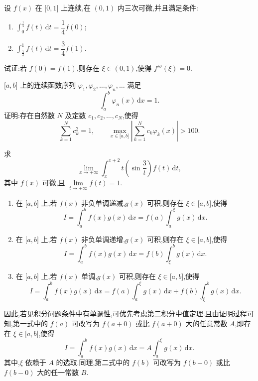 \documentclass[../数学分析培优讲义.tex]{subfiles}
\begin{document}
\begin{example}
设 $f(x)$ 在 $\lbrack 0,1\rbrack$ 上连续,在 $(0,1)$ 内三次可微,并且满足条件:
\begin{enumerate}[label=(\arabic*)]
    \item $\displaystyle\int_0^{\frac{1}{4}}f(t)\,\mathrm{d}t=\dfrac{1}{4}f(0)$;
    \item $\displaystyle\int_{\frac{1}{4}}^1f(t)\,\mathrm{d}t=\dfrac{3}{4}f(1)$.
\end{enumerate}
试证:若 $f(0)=f(1)$,则存在 $\xi\in(0,1)$,使得 $f'''(\xi)=0$.
\end{example}
\exampleblank

\begin{example}
$\lbrack a,b\rbrack$ 上的连续函数序列 $\varphi_1,\varphi_2,\ldots,\varphi_n,\ldots$ 满足
\[
    \int_a^b\varphi_n(x)\,\mathrm{d}x=1.
\]
证明:存在自然数 $N$ 及定数 $c_1,c_2,\ldots,c_N$,使得
\[
    \sum\limits_{k=1}^N c_k^2=1,
    \qquad
    \max\limits_{x\in\lbrack a,b\rbrack}\left|\sum\limits_{k=1}^Nc_k\varphi_k(x)\right|>100.
\]
\end{example}
\exampleblank

\begin{example}
求
\[
    \lim\limits_{x\to+\infty}
    \int_x^{x+2}t\left(\sin\dfrac{3}{t}\right)f(t)\,\mathrm{d}t,
\]
其中 $f(x)$ 可微,且 $\displaystyle\lim\limits_{t\to+\infty}f(t)=1$.
\end{example}
\exampleblank

\begin{theorem}
\begin{enumerate}[label=(\arabic*)]
    \item 在 $\lbrack a,b\rbrack$ 上,若 $f(x)$ 非负单调递减,$g(x)$ 可积,则存在 $\xi\in\lbrack a,b\rbrack$,使得
    \[
        I=\int_a^bf(x)g(x)\,\mathrm{d}x
        =f(a)\int_a^\xi g(x)\,\mathrm{d}x.
    \]
    \item 在 $\lbrack a,b\rbrack$ 上,若 $f(x)$ 非负单调递增,$g(x)$ 可积,则存在 $\xi\in\lbrack a,b\rbrack$,使得
    \[
        I=\int_a^bf(x)g(x)\,\mathrm{d}x
        =f(b)\int_\xi^bg(x)\,\mathrm{d}x.
    \]
    \item 在 $\lbrack a,b\rbrack$ 上,若 $f(x)$ 单调,$g(x)$ 可积,则存在 $\xi\in\lbrack a,b\rbrack$,使得
    \[
        I=\int_a^bf(x)g(x)\,\mathrm{d}x
        =f(a)\int_a^\xi g(x)\,\mathrm{d}x
        +f(b)\int_\xi^bg(x)\,\mathrm{d}x.
    \]
\end{enumerate}
\end{theorem}

\begin{remark}
因此,若见积分问题条件中有单调性,可优先考虑第二积分中值定理.且由证明过程可知,第一式中的 $f(a)$ 可改写为 $f(a+0)$ 或比 $f(a+0)$ 大的任意常数 $A$,即存在 $\xi\in\lbrack a,b\rbrack$,使得
\[
    I=\int_a^bf(x)g(x)\,\mathrm{d}x
    =A\int_a^\xi g(x)\,\mathrm{d}x.
\]
其中,$\xi$ 依赖于 $A$ 的选取.同理,第二式中的 $f(b)$ 可改写为 $f(b-0)$ 或比 $f(b-0)$ 大的任一常数 $B$.
\end{remark}
\end{document}
